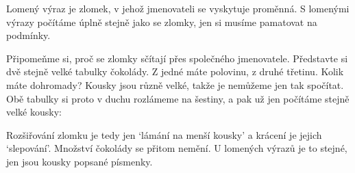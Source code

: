 Lomený výraz je zlomek, v jehož jmenovateli se vyskytuje proměnná. S lomenými výrazy počítáme úplně stejně jako se zlomky, jen si musíme pamatovat na podmínky.

Připomeňme si, proč se zlomky sčítají přes společného jmenovatele. Představte si dvě stejně velké tabulky čokolády. Z jedné máte polovinu, z druhé třetinu. Kolik máte dohromady? Kousky jsou různě velké, takže je nemůžeme jen tak spočítat. Obě tabulky si proto v duchu rozlámeme na šestiny, a pak už jen počítáme stejně velké kousky:
\begin{center}
\end{center}
Rozšiřování zlomku je tedy jen `lámání na menší kousky' a krácení je jejich `slepování'. Množství čokolády se přitom nemění. U lomených výrazů je to stejné, jen jsou kousky popsané písmenky.

